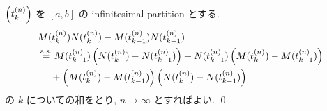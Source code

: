 \documentclass{ltjsarticle}
\begin{document}
\begin{prf}
	\( \left( t_k^{(n)} \right) \) を \( [a,b] \) の infinitesimal partition とする.
	\begin{equation}
		\begin{aligned}
			 & M( t_k^{(n)} ) N( t_k^{(n)} ) - M( t_{k-1}^{(n)} ) N( t_{k-1}^{(n)} )
			\\
			 & \stackrel{ \text{a.s.} }{ = }
			M( t_{k-1}^{(n)} ) \left( N( t_k^{(n)} ) -N( t_{k-1}^{(n)} ) \right)
			+ N( t_{k-1}^{(n)} ) \left( M( t_k^{(n)} ) -M( t_{k-1}^{(n)} ) \right)
			\\
			 & \quad \ + \left( M( t_k^{(n)} ) -M( t_{k-1}^{(n)} ) \right) \left( N( t_k^{(n)} ) -N( t_{k-1}^{(n)} ) \right)
		\end{aligned}
	\end{equation}
	の \( k \) についての和をとり, \( n \to \infty \) とすればよい.
	\qed\end{prf}
\end{document}
